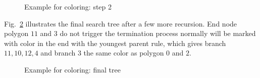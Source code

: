     \begin{figure}[h!]
        \centering
        \caption{Example for coloring: step 2}
        \label{qdt_fig:qdt_color_tree_1}
    \end{figure}
Fig.~\ref{qdt_fig:qdt_color_tree_2} illustrates the final search tree after a few more recursion.
End node polygon $11$ and $3$ do not trigger the termination process normally will be marked with color in the end with the youngest parent rule, which gives branch $11,10,12,4$ and branch $3$ the same color as polygon $0$ and $2$.

    \begin{figure}[h!]
        \centering
        \caption{Example for coloring: final tree}
        \label{qdt_fig:qdt_color_tree_2}
    \end{figure}

